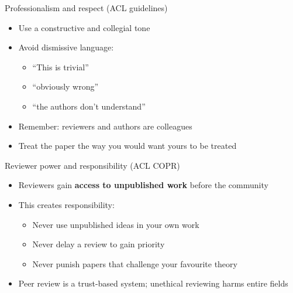 \documentclass[aspectratio=169]{beamer}
\begin{document}

\begin{frame}{Professionalism and respect (ACL guidelines)}
\begin{itemize}
  \item Use a constructive and collegial tone
  \item Avoid dismissive language:
    \begin{itemize}
      \item ``This is trivial''
      \item ``obviously wrong''
      \item ``the authors don't understand''
    \end{itemize}
  \item Remember: reviewers and authors are colleagues
  \item Treat the paper the way you would want yours to be treated
\end{itemize}

\end{frame}


\begin{frame}{Reviewer power and responsibility (ACL COPR)}
\begin{itemize}
  \item Reviewers gain \textbf{access to unpublished work} before the community
  \item This creates responsibility:
    \begin{itemize}
      \item Never use unpublished ideas in your own work
      \item Never delay a review to gain priority
      \item Never punish papers that challenge your favourite theory
    \end{itemize}
  \item Peer review is a trust-based system; unethical reviewing harms entire fields
\end{itemize}

\end{frame}

\end{document}

